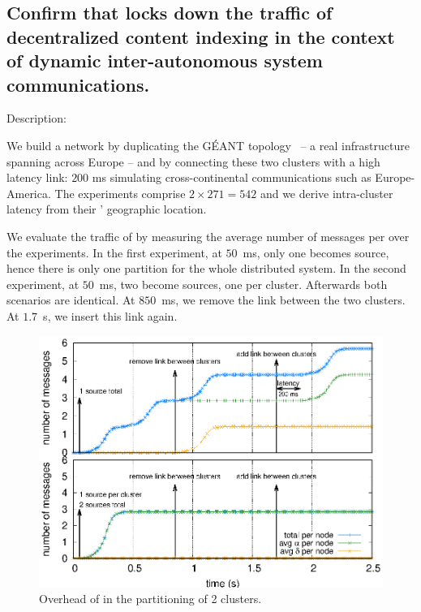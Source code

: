\subsection{Confirm that \NAME locks down the traffic of decentralized content
  indexing in the context of dynamic inter-autonomous system
  communications.}

\begin{asparadesc}
\item [Description:]

We build a network by duplicating the G{\'E}ANT
topology~\cite{knight2011internet} -- a real infrastructure spanning
across Europe -- and by connecting these two clusters with a high
latency link: $200$ ms simulating cross-continental communications
such as Europe-America. The experiments comprise $2 \times 271 = 542$
\processes and we derive intra-cluster latency from their \processes'
geographic location.

\noindent We evaluate the traffic of \NAME by measuring the average
number of messages per \process over the experiments. In the first
experiment, at $50$~ms, only one \process becomes source, hence there
is only one partition for the whole distributed system. In the second
experiment, at $50$~ms, two \processes become sources, one per
cluster. Afterwards both scenarios are identical. At $850$~ms, we
remove the link between the two clusters. At $1.7$~s, we insert this
link again.

\begin{figure}
  \centering\includegraphics[width=0.99\columnwidth]{img/as_cast_geant.eps}
  \caption{\label{fig:geant}Overhead of \NAME in the partitioning of 2 clusters.}
\end{figure}


\end{asparadesc}
